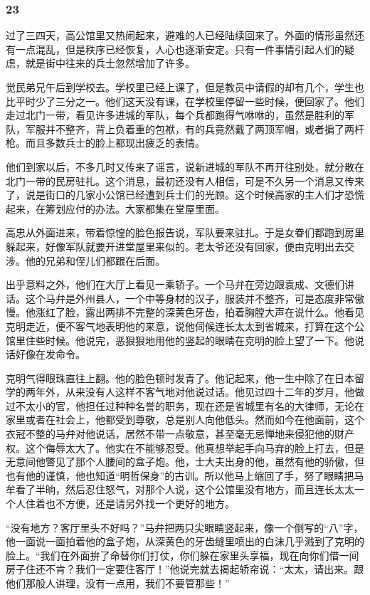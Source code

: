\subsubsection*{23}


\par 过了三四天，高公馆里又热闹起来，避难的人已经陆续回来了。外面的情形虽然还有一点混乱，但是秩序已经恢复，人心也逐渐安定。只有一件事情引起人们的疑虑，就是街中往来的兵士忽然增加了许多。
\par 觉民弟兄午后到学校去。学校里已经上课了，但是教员中请假的却有几个，学生也比平时少了三分之一。他们这天没有课，在学校里停留一些时候，便回家了。他们走过北门一带，看见许多进城的军队，每个兵都跑得气咻咻的，虽然是胜利的军队，军服并不整齐，背上负着重的包袱，有的兵竟然戴了两顶军帽，或者掮了两杆枪。而且多数兵士的脸上都现出疲乏的表情。
\par 他们到家以后，不多几时又传来了谣言，说新进城的军队不再开往别处，就分散在北门一带的民房驻扎。这个消息，最初还没有人相信，可是不久另一个消息又传来了，说是街口的几家小公馆已经遭到兵士们的光顾。这个时候高家的主人们才恐慌起来，在筹划应付的办法。大家都集在堂屋里面。
\par 高忠从外面进来，带着惊惶的脸色报告说，军队要来驻扎。于是女眷们都跑到房里躲起来，好像军队就要开进堂屋里来似的。老太爷还没有回家，便由克明出去交涉。他的兄弟和侄儿们都跟在后面。
\par 出乎意料之外，他们在大厅上看见一乘轿子。一个马弁在旁边跟袁成、文德们讲话。这个马弁是外州县人，一个中等身材的汉子，服装并不整齐，可是态度非常傲慢。他涨红了脸，露出两排不完整的深黄色牙齿，拍着胸膛大声在说什么。他看见克明走近，便不客气地表明他的来意，说他伺候连长太太到省城来，打算在这个公馆里住些时候。他说完，恶狠狠地用他的竖起的眼睛在克明的脸上望了一下。他说话好像在发命令。
\par 克明气得眼珠直往上翻。他的脸色顿时发青了。他记起来，他一生中除了在日本留学的两年外，从来没有人这样不客气地对他说过话。他见过四十二年的岁月，他做过不太小的官，他担任过种种名誉的职务，现在还是省城里有名的大律师，无论在家里或者在社会上，他都受到尊敬，总是别人向他低头。然而如今在他面前，这个衣冠不整的马弁对他说话，居然不带一点敬意，甚至毫无忌惮地来侵犯他的财产权。这个侮辱太大了。他实在不能够忍受。他真想举起手向马弃的脸上打去，但是无意间他瞥见了那个人腰间的盒子炮。他，士大夫出身的他，虽然有他的骄傲，但也有他的谨慎，他也知道“明哲保身”的古训。所以他马上缩回了手，努了眼睛把马牟看了半晌，然后忍住怒气，对那个人说，这个公馆里没有地方，而且连长太太一个人住着也不方便，还是请另外找一个更好的地方。
\par “没有地方？客厅里头不好吗？”马弁把两只尖眼睛竖起来，像一个倒写的“八”字，他一面说一面拍着他的盒子炮，从深黄色的牙齿缝里喷出的白沫几乎溅到了克明的脸上。“我们在外面拚了命替你们打仗，你们躲在家里头享福，现在向你们借一间房子住还不肯？我们一定要住客厅！”他说完就去揭起轿帘说：“太太，请出来。跟他们那般人讲理，没有一点用，我们不要管那些！”
